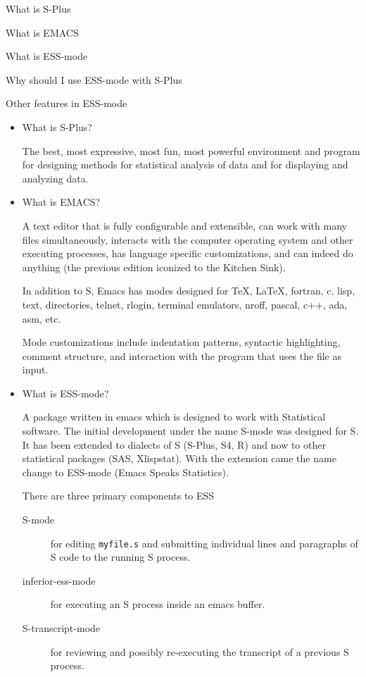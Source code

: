 \documentclass[12pt]{article}   %
\begin{document}
What is S-Plus

What is EMACS

What is ESS-mode

Why should I use ESS-mode with S-Plus

Other features in ESS-mode

\newpage
\begin{itemize}
\item
What is S-Plus?

The best, most expressive, most fun, most powerful environment and
program for designing methods for statistical analysis of data and for
displaying and analyzing data.

\newpage
\item
What is EMACS?

A text editor that is fully configurable and extensible, can work with
many files simultaneously, interacts with the computer operating
system and other executing processes, has language specific
customizations, and can indeed do anything (the previous edition
iconized to the Kitchen Sink).

In addition to S, Emacs has modes designed for \TeX, \LaTeX, fortran,
c, lisp, text, directories, telnet, rlogin, terminal emulators, nroff,
pascal, c++, ada, asm, etc.

Mode customizations include indentation patterns, syntactic
highlighting, comment structure, and interaction with the program that
uses the file as input.

\newpage
\item
What is ESS-mode?

A package written in emacs which is designed to work with Statistical
software.  The initial development under the name S-mode was designed
for S.  It has been extended to dialects of S (S-Plus, S4, R) and now
to other statistical packages (SAS, Xlispstat).  With the extension
came the name change to ESS-mode (Emacs Speaks Statistics).

There are three primary components to ESS
\begin{description}
\item [S-mode] for editing {\tt myfile.s} and submitting individual
lines and paragraphs of S code to the running S process.
\item [inferior-ess-mode]  for executing an S process inside an emacs buffer.
\item [S-transcript-mode] for reviewing and possibly re-executing the
transcript of a previous S process.
\end{description}



\end{itemize}
\end{document}
